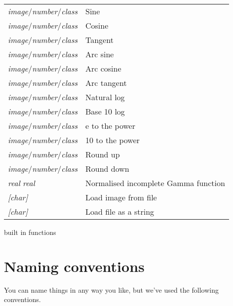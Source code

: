 \begin{tab2}
\begin{center}
\begin{tabular}{||l|l||}
\ct{sin} \textit{image}/\textit{number}/\textit{class} & 
				Sine \\
\ct{cos} \textit{image}/\textit{number}/\textit{class} & 
				Cosine \\
\ct{tan} \textit{image}/\textit{number}/\textit{class} & 
				Tangent \\
\ct{asin} \textit{image}/\textit{number}/\textit{class} & 
				Arc sine \\
\ct{acos} \textit{image}/\textit{number}/\textit{class} & 
				Arc cosine \\
\ct{atan} \textit{image}/\textit{number}/\textit{class} & 
				Arc tangent \\
\ct{log} \textit{image}/\textit{number}/\textit{class} & 
				Natural log \\
\ct{log10} \textit{image}/\textit{number}/\textit{class} & 
				Base 10 log \\
\ct{exp} \textit{image}/\textit{number}/\textit{class} & 
				e to the power \\
\ct{exp10} \textit{image}/\textit{number}/\textit{class} & 
				10 to the power \\
\ct{ceil} \textit{image}/\textit{number}/\textit{class} & 
				Round up \\
\ct{floor} \textit{image}/\textit{number}/\textit{class} & 
				Round down \\
\ct{gammq} \textit{real} \textit{real} & 
				Normalised incomplete Gamma function \\
\hline
\ct{vips\_image} \textit{[char]}& Load image from file \\
\ct{read} \textit{[char]}	& Load file as a string \\
\hline
\end{tabular}
\end{center}
\caption{\nip{} built in functions}
\end{tab2}

\section{Naming conventions}

You can name things in any way you like, but we've used the following
conventions.

